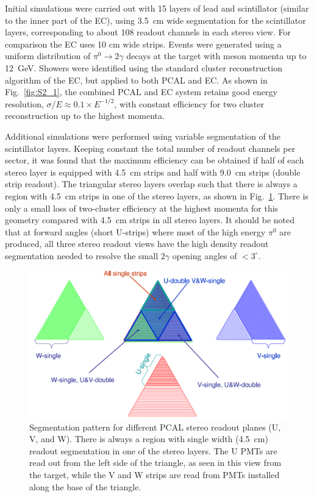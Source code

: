 Initial simulations were carried out with 15 layers of lead and scintillator (similar to the inner part of the EC),
using 3.5~cm wide segmentation for the scintillator layers, corresponding to about 108 readout channels in each
stereo view. For comparison the EC uses 10 cm wide strips. Events were generated using a uniform distribution
of $\pi^{0}\rightarrow 2\gamma$ decays at the target with meson momenta up to 12~GeV. Showers were identified
using the standard cluster reconstruction algorithm of the EC, but applied to both PCAL and EC. As shown in
Fig.~\ref{fig:S2_1}, the combined PCAL and EC system retains good energy resolution,
$\sigma/E \approx 0.1 \times E^{-1/2}$, with constant efficiency for two cluster reconstruction up to the highest
momenta.

Additional simulations were performed using variable segmentation of the scintillator layers. Keeping constant
the total number of readout channels per sector, it was found that the maximum efficiency can be obtained if half
of each stereo layer is equipped with 4.5~cm strips and half with 9.0~cm strips (double strip readout). The triangular
stereo layers overlap such that there is always a region with 4.5~cm strips in one of the stereo layers, as shown in
Fig.~\ref{fig:S2_2}. There is only a small loss of two-cluster efficiency at the highest momenta for this geometry
compared with 4.5~cm strips in all stereo layers. It should be noted that at forward angles (short U-strips) where
most of the high energy $\pi^{0}$ are produced, all three stereo readout views have the high density readout
segmentation needed to resolve the small $2\gamma$ opening angles of $<3^{\circ}$.

\begin{figure}[hbt]
\centering
\includegraphics[width=0.95\columnwidth,keepaspectratio]{img/S2_2.png}
\caption{Segmentation pattern for different PCAL stereo readout planes (U, V, and W). There is always a region
  with single width (4.5~cm) readout segmentation in one of the stereo layers. The U PMTs are read out from the
  left side of the triangle, as seen in this view from the target, while the V and W strips are read from PMTs installed along the base of the triangle.}
\label{fig:S2_2}
\end{figure}



